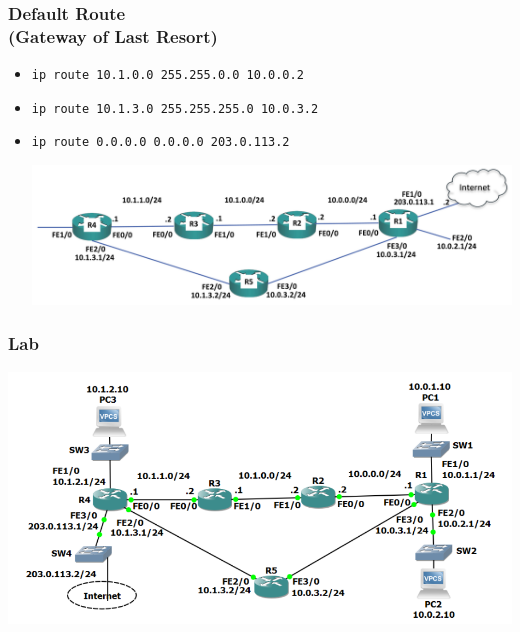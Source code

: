 \documentclass[pdflatex,compress,mathserif]{beamer}
\begin{document}
\begin{frame}
	\frametitle{Default Route\\(Gateway of Last Resort)}
	\begin{itemize}
		\item[] \texttt{ip route 10.1.0.0 255.255.0.0 10.0.0.2}
		\item[] \texttt{ip route 10.1.3.0 255.255.255.0 10.0.3.2}
		\item[] \texttt{ip route 0.0.0.0 0.0.0.0 203.0.113.2}
		\begin{center}
			\includegraphics[width=\linewidth]{img/img11}
		\end{center}
	\end{itemize}
\end{frame}

\begin{frame}
	\frametitle{Lab}
	\begin{center}
		\includegraphics[width=\linewidth]{img/img12}
	\end{center}
\end{frame}
\end{document}
